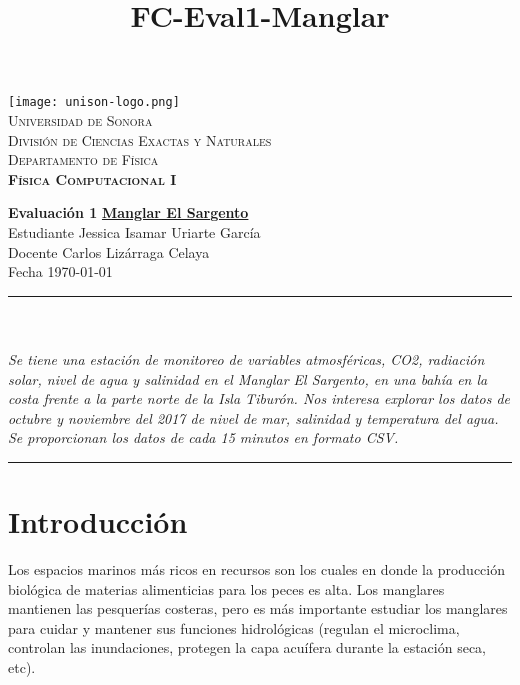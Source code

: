 \documentclass[12pt]{article}
\title{FC-Eval1-Manglar}
\begin{document}

\begin{center}


\texttt{[image: unison-logo.png]}~\\[0.8cm]

\textsc{\LARGE Universidad de Sonora}\\[0.1cm]
\textsc{Divisi\'on de Ciencias Exactas y Naturales}\\[0.1cm]
\textsc{Departamento de F\'isica \\[0.5cm] \textbf{F\'isica Computacional I}}\\%

\end{center}
\noindent
\textbf{Evaluaci\'on 1} \dotfill \textbf{\underline{Manglar El Sargento}}\\
Estudiante \dotfill Jessica Isamar Uriarte Garc\'ia \\
Docente \dotfill Carlos Liz\'arraga Celaya \\
Fecha \dotfill \today \\
\rule{\linewidth}{0.5pt} \\[6pt] 
\abstractname{\\ \emph{ \scriptsize{  \baselinestretch Se tiene una estaci\'on de monitoreo de variables atmosf\'ericas, CO2, radiaci\'on solar, nivel de agua y salinidad en el Manglar El Sargento, en una bah\'ia en la costa frente a la parte norte de la Isla Tibur\'on. Nos interesa explorar los datos de octubre y noviembre del 2017 de nivel de mar, salinidad y temperatura del agua. Se proporcionan los datos de cada 15 minutos en formato CSV.\\} }}
\renewcommand{\baselinestretch}{0.6}
\rule{\linewidth}{2pt}  
\small\tableofcontents

\newpage

\section{Introducci\'on}
\noindent 
Los espacios marinos más ricos en recursos son los cuales en donde la producción  biológica de materias  alimenticias para los peces es alta. Los manglares mantienen las pesquerías costeras, pero es m\'as importante estudiar los manglares para cuidar y mantener sus funciones hidrol\'ogicas (regulan el microclima, controlan las inundaciones, protegen la capa acuífera durante la estación seca, etc).
\end{document}
